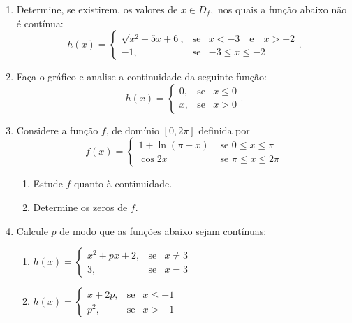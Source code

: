 \begin{enumerate}
\item Determine, se existirem, os valores de $x \in
D_f,$ nos quais a função abaixo não é contínua:
$$ h(x) = \left\{\begin{array}{rcl}\displaystyle\sqrt{x^2 + 5x + 6},& \mbox{se}& x < -3 \quad \mbox{e} \quad x
> -2\\
-1,& \mbox{se}& -3\leq x \leq -2\end{array} \right. .$$

\item Faça o gráfico e analise a continuidade da seguinte
função:
$$h(x) = \left\{\begin{array}{rcl} 0,& \mbox{se}& x \leq
0\\
x,& \mbox{se}&x > 0\end{array} \right. .$$

\item Considere a função $f$, de  domínio  $[0,2\pi]$ definida por
$$
f(x) = 
\begin{cases}
 1+\ln{(\pi -x)}& \text{  se  } 0\leq x\leq \pi\\
 \cos{2x}& \text{  se  }  \pi \leq x\leq 2\pi
\end{cases}
$$
\begin{enumerate}
    \item Estude $f$ quanto à continuidade.
    \item Determine os zeros de $f$.
\end{enumerate}


\item Calcule $p$ de modo que as funções abaixo sejam contínuas:
\begin{enumerate}
\item $ h(x) = \left\{\begin{array}{rcl} x^2 + px + 2,&
\mbox{se}&x\ne 3\\
 3,& \mbox{se}&x = 3\end{array} \right.$
\item $h(x) = \left\{\begin{array}{rcl} x + 2p,& \mbox{se}&x
\leq -1\\
 p^2,& \mbox{se}& x
> -1\end{array} \right.$
\end{enumerate}



\end{enumerate}
